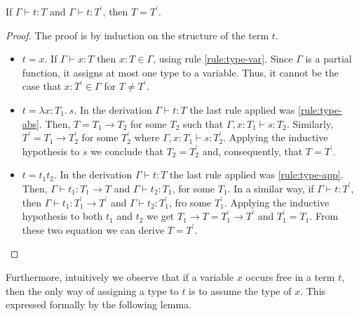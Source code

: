 \begin{theorem} If $\Gamma \vdash t: T$ and $\Gamma \vdash t: T^{'}$, then $T = T^{'}$. 
\end{theorem}
\begin{proof}
The proof is by induction on the structure of the term $t$. 
\begin{itemize}
\item $t = x$. If $\Gamma \vdash x:T$ then $x:T \in \Gamma$, using rule \eqref{rule:type-var}. Since $\Gamma$ is a partial function, it assigns at most one type to a variable. Thus, it cannot be the case that $x:T^{'} \in \Gamma$ for $T \neq T^{'}$. 
\item $t = \lambda x:T_1. \ s$. In the derivation $\Gamma \vdash t : T$ the last rule applied was \eqref{rule:type-abs}. Then, $T = T_1 \to T_2$ for some $T_2$ such that $\Gamma, x:T_1 \vdash s:T_2$. Similarly, $T^{'} = T_1 \to T^{'}_2$ for some $T^{'}_2$ where $\Gamma, x:T_1 \vdash s:T^{'}_2$. Applying the inductive hypothesis to $s$ we conclude that $T_2 = T^{'}_2$ and, consequently,  that $T = T^{'}$. 
\item $t = t_1t_2$. In the derivation $\Gamma \vdash t : T$ the last rule applied was \eqref{rule:type-app}. Then, $\Gamma \vdash t_1 : T_1 \to T$ and $\Gamma \vdash t_2 : T_1$, for some $T_1$. In a similar way, if $\Gamma \vdash t: T^{'}$, then $\Gamma \vdash t_1 : T^{'}_1 \to T^{'}$ and $\Gamma \vdash t_2 : T^{'}_1$, fro some $T^{'}_1$. Applying the inductive hypothesis to both $t_1$ and $t_2$ we get $T_1 \to T = T^{'}_1 \to T^{'}$ and $T^{'}_1 = T_1$. From these two equation we can derive $T = T^{'}$. 
\end{itemize}
\end{proof}

Furthermore, intuitively we observe that if a variable $x$ occurs free in a term $t$, then the only way of assigning a type to $t$ is to assume the type of $x$. This expressed formally by the following lemma. 

